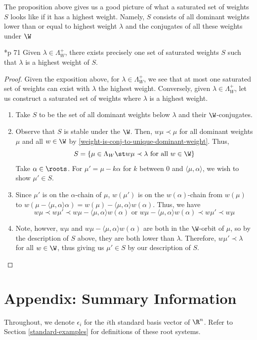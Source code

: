 \documentclass[11pt,leqno,oneside]{amsart}
\numberwithin{thm}{section}
\newcommand{\weightlattice}{\Lambda_W}
\begin{document}
The proposition above gives us a good picture of what a saturated set
of weights \(S\) looks like if it has a highest weight. Namely, \(S\)
consists of all dominant weights lower than or equal to highest weight
\(\lambda\) and the conjugates of all these weights under \(\W\)
\begin{cor}
  \cite{humph}*{p 71} Given \(\lambda \in \weightlattice^+\), there exists precisely one
  set of saturated weights \(S\) such that \(\lambda\) is a highest
  weight of \(S\).
\end{cor}
\begin{proof}
  Given the exposition above, for \(\lambda \in \weightlattice^+\), we
  see that at most one saturated set of weights can exist with
  \(\lambda\) the highest weight. Conversely, given \(\lambda \in
  \weightlattice^+\), let us construct a saturated set of weights where
  \(\lambda\) is a highest weight.
  \begin{enumerate}
  \item Take \(S\) to be the set of all dominant weights below
    \(\lambda\) and their \(\W\)-conjugates.
  \item Observe that \(S\) is stable under the \(\W\). Then, \(w \mu
    \prec \mu\) for all dominant weights \(\mu\) and all \(w \in
    \W\) by \ref{weight-is-conj-to-unique-dominant-weight}. Thus, \[
      S = \{\mu \in \weightlattice \st w \mu \prec \lambda \text{ for
        all } w \in \W\}
    \]
    Take \(\alpha \in \roots\). For \(\mu' = \mu - k \alpha\) for
    \(k\) between \(0\) and 
    \(\langle \mu, \alpha \rangle\), we wish to show \(\mu' \in S\).
  \item Since \(\mu'\) is on the \(\alpha\)-chain of \(\mu\),
    \(w(\mu')\) is on the \(w(\alpha)\)-chain from \(w(\mu)\) to
    \(w(\mu-\langle \mu,\alpha \rangle \alpha) = w(\mu)-\langle
    \mu,\alpha \rangle w(\alpha)\). Thus, we have \[
      w \mu \prec w \mu' \prec w \mu - \langle \mu,\alpha \rangle w
      (\alpha) \text{ or } w \mu - \langle \mu,\alpha \rangle w
      (\alpha) \prec w \mu' \prec w\mu
    \]
  \item Note, howver, \(w\mu\) and \(w \mu - \langle \mu,\alpha \rangle w
      (\alpha)\) are both in the \(\W\)-orbit of \(\mu\), so by the
      description of \(S\) above, they are both lower than
      \(\lambda\). Therefore, \(w \mu' \prec \lambda\) for all \(w \in
      \W\), thus giving us \(\mu' \in S\) by our description of \(S\).
  \end{enumerate}
\end{proof}
\section{Appendix: Summary Information}
Throughout, we denote \(\epsilon_i\) for the \(i\)th standard basis
vector of \(\R^n\). Refer to Section \ref{standard-examples} for definitions of these root systems.
\end{document}
